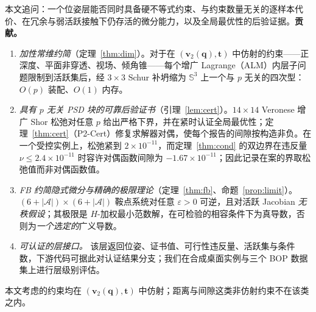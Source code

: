 本文追问：一个位姿层能否同时具备硬不等式约束、与约束数量无关的逐样本代价、在冗余与弱活跃接触下仍存活的微分能力，以及全局最优性的后验证据。\textbf{贡献。}
\begin{enumerate}
\item \emph{加性常维约简}（定理~\ref{thm:dim}）。对于在 $(\mathbf v_2(\mathbf q),\mathbf t)$ 中仿射的约束——正深度、平面非穿透、视场、倾角锥——每个增广 Lagrange（ALM）内层子问题限制到活跃集后，经 $3\times3$ Schur 补坍缩为 $\mathbb{S}^3$ 上一个与 $p$ 无关的四次型：$O(p)$ 装配、$O(1)$ 内存。
\item \emph{具有 $p$ 无关 PSD 块的可靠后验证书}（引理~\ref{lem:cert}）。$14\times14$ Veronese 增广 Shor 松弛对任意 $p$ 给出严格下界，并在紧时认证全局最优性；定理~\ref{thm:cert}（P2-Cert）修复求解器对偶，使每个报告的间隙按构造非负。在一个受控实例上，松弛紧到 $2\times10^{-11}$，而定理~\ref{thm:cond} 的双边界在违反量 $\nu\le2.4\times10^{-11}$ 时容许对偶函数间隙为 $-1.67\times10^{-11}$；因此记录在案的界取松弛值而非对偶函数值。
\item \emph{FB 约简隐式微分与精确的极限理论}（定理~\ref{thm:fb}、命题~\ref{prop:limit}）。$(6+|\mathcal A|)\times(6+|\mathcal A|)$ 鞍点系统对任意 $\varepsilon>0$ 可逆，且对活跃 Jacobian \emph{无秩假设}；其极限是 $H$-加权最小范数解，在可检验的相容条件下为真导数，否则为\emph{一个选定的}广义导数。
\item \emph{可认证的层接口。} 该层返回位姿、证书值、可行性违反量、活跃集与条件数，下游代码可据此对认证结果分支；我们在合成桌面实例与三个 BOP 数据集上进行层级别评估。
\end{enumerate}
本文考虑的约束均在 $(\mathbf v_2(\mathbf q),\mathbf t)$ 中仿射；距离与间隙这类非仿射约束不在该类之内。
